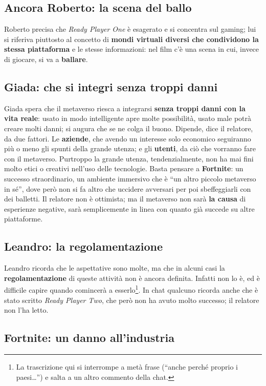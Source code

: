 \subsection{Ancora Roberto: la scena del ballo}

Roberto precisa che \emph{Ready Player One} è esagerato e si concentra sul
gaming; lui si riferiva piuttosto al concetto di \textbf{mondi virtuali diversi
che condividono la stessa piattaforma} e le stesse informazioni: nel film c'è una
scena in cui, invece di giocare, si va a \textbf{ballare}.

\subsection{Giada: che si integri senza troppi danni}

Giada spera che il metaverso riesca a integrarsi \textbf{senza troppi danni con
la vita reale}: usato in modo intelligente apre molte possibilità, usato male
potrà creare molti danni; si augura che se ne colga il buono. Dipende, dice il
relatore, da due fattori. Le \textbf{aziende}, che avendo un interesse solo
economico seguiranno più o meno gli spunti della grande utenza; e gli
\textbf{utenti}, da ciò che vorranno fare con il metaverso. Purtroppo la grande
utenza, tendenzialmente, non ha mai fini molto etici o creativi nell'uso delle
tecnologie. Basta pensare a \textbf{Fortnite}: un successo straordinario, un
ambiente immersivo che è ``un altro piccolo metaverso in sé'', dove però non si
fa altro che uccidere avversari per poi sbeffeggiarli con dei balletti. Il
relatore non è ottimista; ma il metaverso non sarà \textbf{la causa} di
esperienze negative, sarà semplicemente in linea con quanto già succede su altre
piattaforme.

\subsection{Leandro: la regolamentazione}

Leandro ricorda che le aspettative sono molte, ma che in alcuni casi la
\textbf{regolamentazione} di queste attività non è ancora definita. Infatti non lo
è, ed è difficile capire quando comincerà a esserlo\footnote{La trascrizione
qui si interrompe a metà frase (``anche perché proprio i paesi\dots'') e salta a
un altro commento della chat.}. In chat qualcuno ricorda anche che è stato
scritto \emph{Ready Player Two}, che però non ha avuto molto successo; il
relatore non l'ha letto.

\subsection{Fortnite: un danno all'industria}

